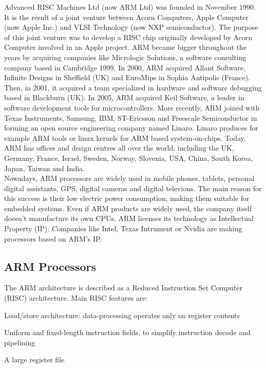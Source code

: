 \documentclass[pdftex,10pt,a4paper]{report}
\newenvironment{packed_item}{
\begin{itemize}
  \setlength{\itemsep}{1pt}
  \setlength{\parskip}{0pt}
  \setlength{\parsep}{0pt}
}{\end{itemize}}
\begin{document}
Advanced RISC Machines Ltd (now ARM Ltd) was founded in November 1990. It is the result of a joint venture between Acorn Computers, Apple Computer (now Apple Inc.) and VLSI Technology (now NXP semiconductor). The purpose of this joint venture was to develop a RISC chip originally developed by Acorn Computer involved in an Apple project. ARM became bigger throughout the years by acquiring companies like Micrologic Solutions, a software consulting company based in Cambridge 1999. In 2000, ARM acquired Allant Software, Infinite Designs in Sheffield (UK) and EuroMips in Sophia Antipolis (France). Then, in 2001, it acquired a team specialized in hardware and software debugging based in Blackburn (UK). In 2005, ARM acquired Keil Software, a leader in software development tools for microcontrollers. More recently, ARM joined with Texas Instruments, Samsung, IBM, ST-Ericsson and Freescale Semiconductor in forming an open source engineering company named Linaro. Linaro produces for example ARM tools or linux kernels for ARM based system-on-chips. Today, ARM has offices and design centres all over the world, including the UK, Germany, France, Israel, Sweden, Norway, Slovenia, USA, China, South Korea, Japan, Taiwan and India. 
\\

Nowadays, ARM processors are widely used in mobile phones, tablets, personal digital assistants, GPS, digital cameras and digital televions. The main reason for this success is their low electric power consumption, making them suitable for embedded systems. Even if ARM products are widely used, the company itself doesn't manufacture its own CPUs. ARM licenses its technology as Intellectual Property (IP). Companies like Intel, Texas Intrument or Nvidia are making processors based on ARM's IP.

\subsection{ARM Processors}
The ARM architecture is described as a Reduced Instruction Set Computer (RISC) architecture. Main RISC features are:
\begin{packed_item}
	\item Load/store architecture: data-processing operates only on register contents
	\item Uniform and fixed-length instruction fields, to simplify instruction decode and pipelining
	\item A large register file
\end{packed_item}
\end{document}

